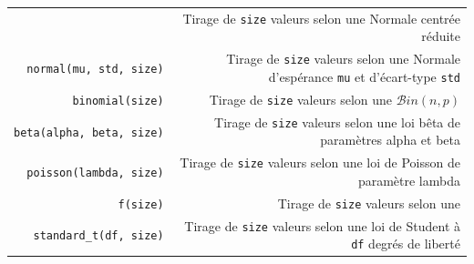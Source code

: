 \documentclass[12pt,]{book}
\numberwithin{equation}{section}
\numberwithin{countremarque}{section}
\begin{document}
\begin{longtable}[]{@{}rr@{}}
\begin{minipage}[t]{0.18\columnwidth}
\end{minipage} & \begin{minipage}[t]{0.71\columnwidth}\raggedleft\strut
Tirage de \texttt{size} valeurs selon une Normale centrée réduite\strut
\end{minipage}\tabularnewline
\begin{minipage}[t]{0.18\columnwidth}\raggedleft\strut
\texttt{normal(mu,\ std,\ size)}\strut
\end{minipage} & \begin{minipage}[t]{0.71\columnwidth}\raggedleft\strut
Tirage de \texttt{size} valeurs selon une Normale d'espérance
\texttt{mu} et d'écart-type \texttt{std}\strut
\end{minipage}\tabularnewline
\begin{minipage}[t]{0.18\columnwidth}\raggedleft\strut
\texttt{binomial(size)}\strut
\end{minipage} & \begin{minipage}[t]{0.71\columnwidth}\raggedleft\strut
Tirage de \texttt{size} valeurs selon une \(\mathcal{B}in(n,p)\)\strut
\end{minipage}\tabularnewline
\begin{minipage}[t]{0.18\columnwidth}\raggedleft\strut
\texttt{beta(alpha,\ beta,\ size)}\strut
\end{minipage} & \begin{minipage}[t]{0.71\columnwidth}\raggedleft\strut
Tirage de \texttt{size} valeurs selon une loi bêta de paramètres alpha
et beta\strut
\end{minipage}\tabularnewline
\begin{minipage}[t]{0.18\columnwidth}\raggedleft\strut
\texttt{poisson(lambda,\ size)}\strut
\end{minipage} & \begin{minipage}[t]{0.71\columnwidth}\raggedleft\strut
Tirage de \texttt{size} valeurs selon une loi de Poisson de paramètre
lambda\strut
\end{minipage}\tabularnewline
\begin{minipage}[t]{0.18\columnwidth}\raggedleft\strut
\texttt{f(size)}\strut
\end{minipage} & \begin{minipage}[t]{0.71\columnwidth}\raggedleft\strut
Tirage de \texttt{size} valeurs selon une\strut
\end{minipage}\tabularnewline
\begin{minipage}[t]{0.18\columnwidth}\raggedleft\strut
\texttt{standard\_t(df,\ size)}\strut
\end{minipage} & \begin{minipage}[t]{0.71\columnwidth}\raggedleft\strut
Tirage de \texttt{size} valeurs selon une loi de Student à \texttt{df}
degrés de liberté\strut
\end{minipage}\tabularnewline
\bottomrule
\end{longtable}
\end{document}
